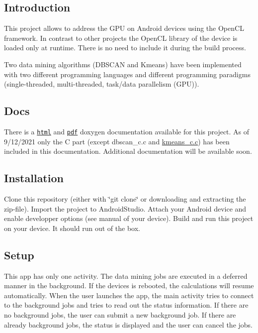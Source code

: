 \subsection*{Introduction}

This project allows to address the G\+PU on Android devices using the Open\+CL framework. In contrast to other projects the Open\+CL library of the device is loaded only at runtime. There is no need to include it during the build process.

Two data mining algorithms (D\+B\+S\+C\+AN and Kmeans) have been implemented with two different programming languages and different programming paradigms (single-\/threaded, multi-\/threaded, task/data parallelism (G\+PU)).

\subsection*{Docs}

There is a \href{app/doc/html/index.html}{\tt html} and \href{app/doc/latex/refman.pdf}{\tt pdf} doxygen documentation available for this project. As of 9/12/2021 only the C part (except dbscan\+\_\+c.\+c and \mbox{\hyperlink{kmeans__c_8c}{kmeans\+\_\+c.\+c}}) has been included in this documentation. Additional documentation will be available soon.

\subsection*{Installation}

Clone this repository (either with \char`\"{}git clone\char`\"{} or downloading and extracting the zip-\/file). Import the project to Android\+Studio. Attach your Android device and enable developper options (see manual of your device). Build and run this project on your device. It should run out of the box.

\subsection*{Setup}

This app has only one activity. The data mining jobs are executed in a deferred manner in the background. If the devices is rebooted, the calculations will resume automatically. When the user launches the app, the main activity tries to connect to the background jobs and tries to read out the status information. If there are no background jobs, the user can submit a new background job. If there are already background jobs, the status is displayed and the user can cancel the jobs.

